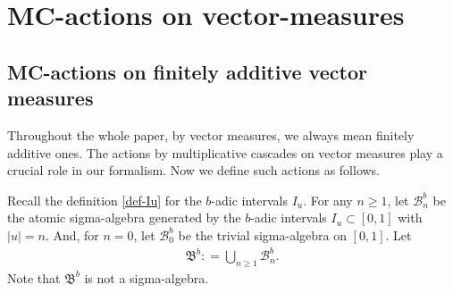 \documentclass[12pt]{amsart}
\theoremstyle{definition}
\theoremstyle{remark}
\numberwithin{equation}{section}
\begin{document}
 
 

 
 

\section{MC-actions on vector-measures}\label{sec-CAV}



\subsection{MC-actions on finitely additive vector measures}
Throughout the whole paper, by vector measures, we always mean finitely additive ones.   The actions by multiplicative cascades on  vector measures play a crucial role in our formalism.   Now we define such actions as follows.  






Recall the definition \eqref{def-Iu} for the $b$-adic intervals $I_u$.   For any $n\ge 1$, let $\mathscr{B}_n^b$ be  the atomic sigma-algebra generated by the $b$-adic intervals $I_u\subset [0,1]$ with $|u|=n$. And,  for $n=0$, let $\mathscr{B}_0^b$  be the trivial sigma-algebra on $[0,1]$.   Let
\begin{align}\label{def-B-alg}
\mathfrak{B}^b: = \bigcup_{n\ge 1} \mathscr{B}_n^b. 
\end{align}
Note that $\mathfrak{B}^b$ is not a sigma-algebra.  
\end{document}
